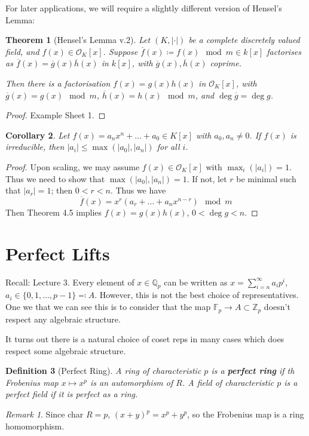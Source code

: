 \documentclass[]{article}
\theoremstyle{custhm}
\newtheorem{theorem}{Theorem}[section]
\theoremstyle{cusdef}
\newtheorem{defin}[theorem]{Definition}
\theoremstyle{custhm}
\theoremstyle{custhm}
\newtheorem{cor}[theorem]{Corollary}
\theoremstyle{custhm}
\theoremstyle{custhm}
\theoremstyle{cusdef}
\theoremstyle{remark}
\newtheorem*{remark*}{Remark}
\newcommand{\Z}{\mathbb{Z}}
\newcommand{\Q}{\mathbb{Q}}
\newcommand{\ra}{\rightarrow}
\newcommand{\undf}[1]{\textit{\textbf{#1}}}
\newcommand{\valk}{(K,|\cdot|)}
\renewcommand{\bar}{\overline}
\renewcommand{\O}{\mathcal{O}}
\begin{document}
For later applications, we will require a slightly different version of Hensel's Lemma:

\begin{theorem}[Hensel's Lemma v.2]
Let $\valk$ be a complete discretely valued field, and $f(x)\in \O_K[x]$. Suppose $\bar{f}(x)\coloneqq f(x)\mod m\in k[x]$ factorises as $\bar{f}(x) = \bar{g}(x)\bar{h}(x)$ in $k[x]$, with $\bar{g}(x),\bar{h}(x)$ coprime.

Then there is a factorisation $f(x) = g(x)h(x)$ in $\O_K[x]$, with $\bar{g}(x) = g(x) \mod m$, $\bar{h}(x) = h(x)\mod m$, and $\deg \bar{g} = \deg g$.
\end{theorem}
\begin{proof}
Example Sheet 1.
\end{proof}
\begin{cor}
Let $f(x) = a_nx^n + \dots + a_0 \in K[x]$ with $a_0,a_n\ne 0$. If $f(x)$ is irreducible, then $|a_i| \le \max (|a_0|,|a_n|)$ for all $i$.
\end{cor}
\begin{proof}
Upon scaling, we may assume $f(x)\in \O_K[x]$ with $\max_i (|a_i|) = 1$. Thus we need to show that $\max(|a_0|,|a_n|) = 1$. If not, let $r$ be minimal such that $|a_r| = 1$; then $0 < r < n$. Thus we have
\[
\bar{f}(x) = x^r(a_r + \dots + a_n x^{n-r})\mod m
\]
Then Theorem 4.5 implies $f(x) = g(x)h(x)$, $0 < \deg g < n$.
\end{proof}

\section{Perfect Lifts}

Recall: Lecture 3. Every element of $x\in \Q_p$ can be written as $x = \sum_{i=n}^{\infty}a_ip^i$, $a_i\in \{0,1,\dots,p-1\}\eqqcolon A$. However, this is not the best choice of representatives. One we that we can see this is to consider that the map $\mathbb{F}_p \ra A\subset\Z_p$ doesn't respect any algebraic structure.

It turns out there is a natural choice of coset reps in many cases which does respect some algebraic structure.

\begin{defin}[Perfect Ring]
A ring of characteristic $p$ is a \undf{perfect ring} if th Frobenius map $x\mapsto x^p$ is an automorphism of $R$. A field of characteristic $p$ is a perfect field if it is perfect as a ring.
\end{defin}
\begin{remark*}
Since char $R = p$, $(x+y)^p = x^p + y^p$, so the Frobenius map is a ring homomorphism.
\end{remark*}
\end{document}
